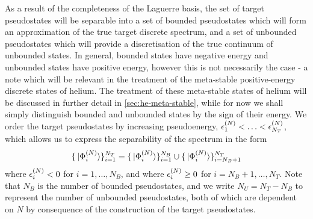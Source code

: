 \documentclass[draft]{article}
\begin{document}
As a result of the completeness of the Laguerre basis, the set of target
pseudostates will be separable into a set of bounded pseudostates which will
form an approximation of the true target discrete spectrum, and a set of
unbounded pseudostates which will provide a discretisation of the true continuum
of unbounded states.
In general, bounded states have negative energy and unbounded states have
positive energy, however this is not necessarily the case - a note which will be
relevant in the treatment of the meta-stable positive-energy discrete states of
helium.
The treatment of these meta-stable states of helium will be discussed in further
detail in \autoref{sec:he-meta-stable}, while for now we shall simply
distinguish bounded and unbounded states by the sign of their energy.
We order the target pseudostates by increasing pseudoenergy,
$\epsilon_{1}^{(N)} < \dotsc < \epsilon_{N_{T}}^{(N)}$, which allows us to
express the separability of the spectrum in the form
\begin{equation}
  \label{eq:target-spectrum-separable}
  \lbrace\ket*{\Phi_{i}^{(N)}}\rbrace_{i = 1}^{N_{T}}
  =
  \lbrace\ket*{\Phi_{i}^{(N)}}\rbrace_{i = 1}^{N_{B}}
  \cup
  \lbrace\ket*{\Phi_{i}^{(N)}}\rbrace_{i = N_{B} + 1}^{N_{T}}
\end{equation}
where $\epsilon_{i}^{(N)} < 0$ for $i = 1, \dotsc, N_{B}$, and where
$\epsilon_{i}^{(N)} \geq 0$ for $i = N_{B} + 1, \dotsc, N_{T}$.
Note that $N_{B}$ is the number of bounded pseudostates, and we write
$N_{U} = N_{T} - N_{B}$ to represent the number of unbounded pseudostates, both of
which are dependent on $N$ by consequence of the construction of the target
pseudostates.
\end{document}
